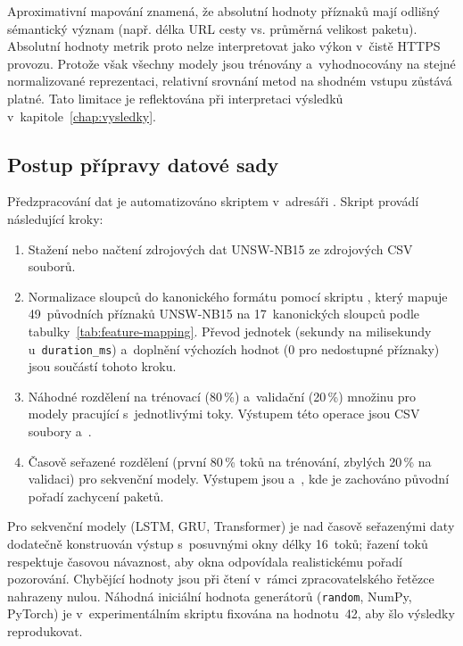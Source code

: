 Aproximativní mapování znamená, že absolutní hodnoty příznaků mají odlišný sémantický význam (např. délka URL cesty vs. průměrná velikost paketu). Absolutní hodnoty metrik proto nelze interpretovat jako výkon v~čistě HTTPS provozu. Protože však všechny modely jsou trénovány a~vyhodnocovány na stejné normalizované reprezentaci, relativní srovnání metod na shodném vstupu zůstává platné. Tato limitace je reflektována při interpretaci výsledků v~kapitole~\ref{chap:vysledky}.

\subsection{Postup přípravy datové sady}
\label{sec:priprava-dat}

Předzpracování dat je automatizováno skriptem  v~adresáři . Skript provádí následující kroky:

\begin{enumerate}
\item Stažení nebo načtení zdrojových dat UNSW-NB15 ze zdrojových CSV souborů.
\item Normalizace sloupců do kanonického formátu pomocí skriptu , který mapuje 49~původních příznaků UNSW-NB15 na 17~kanonických sloupců podle tabulky~\ref{tab:feature-mapping}. Převod jednotek (sekundy na milisekundy u~\texttt{duration\_ms}) a~doplnění výchozích hodnot (0 pro nedostupné příznaky) jsou součástí tohoto kroku.
\item Náhodné rozdělení na trénovací (80\,\%) a~validační (20\,\%) množinu pro modely pracující s~jednotlivými toky. Výstupem této operace jsou CSV soubory  a~.
\item Časově seřazené rozdělení (první 80\,\% toků na trénování, zbylých 20\,\% na validaci) pro sekvenční modely. Výstupem jsou  a~, kde je zachováno původní pořadí zachycení paketů.
\end{enumerate}

Pro sekvenční modely (LSTM, GRU, Transformer) je nad časově seřazenými daty dodatečně konstruován výstup s~posuvnými okny délky 16~toků; řazení toků respektuje časovou návaznost, aby okna odpovídala realistickému pořadí pozorování. Chybějící hodnoty jsou při čtení v~rámci zpracovatelského řetězce nahrazeny nulou. Náhodná iniciální hodnota generátorů (\texttt{random}, NumPy, PyTorch) je v~experimentálním skriptu  fixována na hodnotu~42, aby šlo výsledky reprodukovat.

